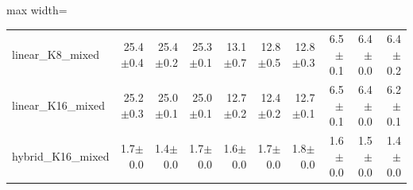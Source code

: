 \begin{table}[!htb]
\begin{adjustbox}{max width=\linewidth}
\begin{tabular}{lrrrrrrrrr}
linear\_K8\_mixed & 25.4$\pm$0.4 & 25.4$\pm$0.2 & 25.3$\pm$0.1 & 13.1$\pm$0.7 & 12.8$\pm$0.5 & 12.8$\pm$0.3 & 6.5$\pm$0.1 & 6.4$\pm$0.0 & 6.4$\pm$0.2 \\
linear\_K16\_mixed & 25.2$\pm$0.3 & 25.0$\pm$0.1 & 25.0$\pm$0.1 & 12.7$\pm$0.2 & 12.4$\pm$0.2 & 12.7$\pm$0.1 & 6.5$\pm$0.1 & 6.4$\pm$0.0 & 6.2$\pm$0.1 \\
hybrid\_K16\_mixed & 1.7$\pm$0.0 & 1.4$\pm$0.0 & 1.7$\pm$0.0 & 1.6$\pm$0.0 & 1.7$\pm$0.0 & 1.8$\pm$0.0 & 1.6$\pm$0.0 & 1.5$\pm$0.0 & 1.4$\pm$0.0 \\
\bottomrule
\end{tabular}
\end{adjustbox}
\end{table}
